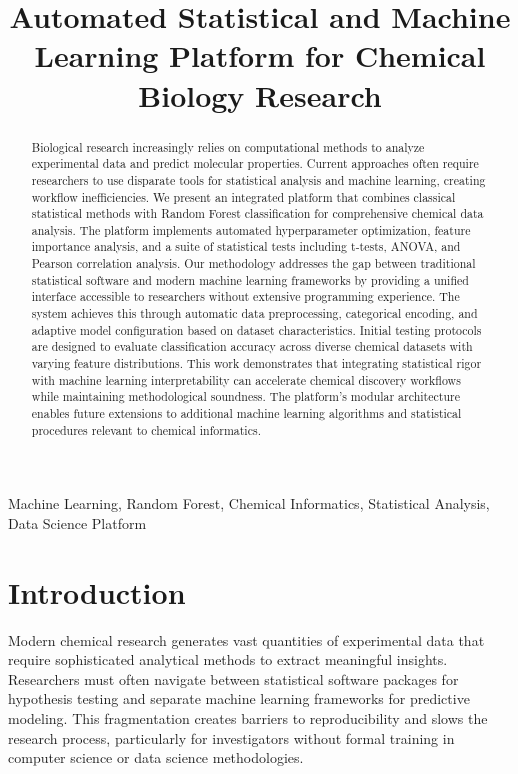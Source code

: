 \documentclass[conference]{IEEEtran}
\begin{document}
\title{Automated Statistical and Machine Learning Platform for Chemical Biology Research}

\maketitle

\begin{abstract}
Biological research increasingly relies on computational methods to analyze experimental data and predict molecular properties. Current approaches often require researchers to use disparate tools for statistical analysis and machine learning, creating workflow inefficiencies. We present an integrated platform that combines classical statistical methods with Random Forest classification for comprehensive chemical data analysis. The platform implements automated hyperparameter optimization, feature importance analysis, and a suite of statistical tests including t-tests, ANOVA, and Pearson correlation analysis. Our methodology addresses the gap between traditional statistical software and modern machine learning frameworks by providing a unified interface accessible to researchers without extensive programming experience. The system achieves this through automatic data preprocessing, categorical encoding, and adaptive model configuration based on dataset characteristics. Initial testing protocols are designed to evaluate classification accuracy across diverse chemical datasets with varying feature distributions. This work demonstrates that integrating statistical rigor with machine learning interpretability can accelerate chemical discovery workflows while maintaining methodological soundness. The platform's modular architecture enables future extensions to additional machine learning algorithms and statistical procedures relevant to chemical informatics.
\end{abstract}

\begin{IEEEkeywords}
Machine Learning, Random Forest, Chemical Informatics, Statistical Analysis, Data Science Platform
\end{IEEEkeywords}

\section{Introduction}

Modern chemical research generates vast quantities of experimental data that require sophisticated analytical methods to extract meaningful insights. Researchers must often navigate between statistical software packages for hypothesis testing and separate machine learning frameworks for predictive modeling. This fragmentation creates barriers to reproducibility and slows the research process, particularly for investigators without formal training in computer science or data science methodologies.
\end{document}
